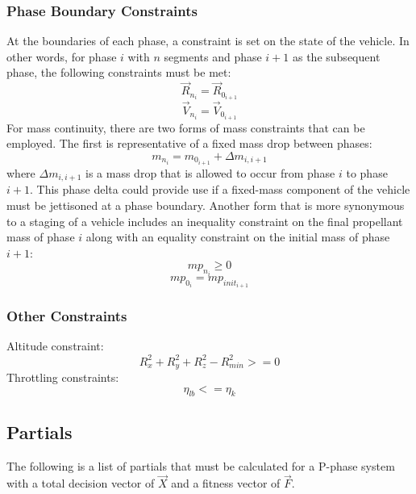 \subsubsection{Phase Boundary Constraints}
At the boundaries of each phase, a constraint is set on the state of the vehicle. In other words, for phase $i$ with $n$ segments and phase $i+1$ as the subsequent phase, the following constraints must be met:
\begin{equation}
\vec{R}_{n_{i}} = \vec{R}_{0_{i+1}}
\end{equation}
\begin{equation}
\vec{V}_{n_{i}} = \vec{V}_{0_{i+1}}
\end{equation}
For mass continuity, there are two forms of mass constraints that can be employed. The first is representative of a fixed mass drop between phases:
\begin{equation}
m_{n_{i}} = m_{0_{i+1}} + \Delta m_{i,i+1}
\end{equation}
where $\Delta m_{i,i+1}$ is a mass drop that is allowed to occur from phase $i$ to phase $i+1$. This phase delta could provide use if a fixed-mass component of the vehicle must be jettisoned at a phase boundary. Another form that is more synonymous to a staging of a vehicle includes an inequality constraint on the final propellant mass of phase $i$ along with an equality constraint on the initial mass of phase $i+1$:
\begin{equation}
mp_{n_{i}} \geq 0
\end{equation}
\begin{equation}
mp_{0_{i}} = mp_{\mathit{init}_{i+1}}
\end{equation}
\subsubsection{Other Constraints}
Altitude constraint:
\begin{equation}
R_x^2 + R_y^2 + R_z^2 - R_{min}^2 >= 0
\end{equation}
Throttling constraints:
\begin{equation}
\eta_{lb} <= \eta_{k}
\end{equation}
\subsection{Partials}
The following is a list of partials that must be calculated for a P-phase system with a total decision vector of $\vec{X}$ and a fitness vector of $\vec{F}$.

